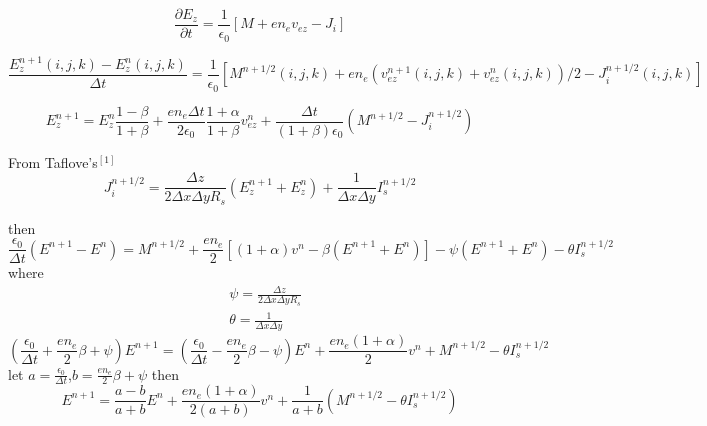 \documentclass[a4paper,10pt]{article}
\begin{document}
\begin{equation}\label{eqEz}
\frac{\partial E_{z}}{\partial t}=\frac{1}{\epsilon_{0}}\left[M+e n_{e}v_{ez}-J_i\right]
\end{equation}

\begin{equation}
\frac{E_{z}^{n+1}(i,j,k)-E_{z}^{n}(i,j,k)}{\Delta t}=\frac{1}{\epsilon_{0}}\left[M^{n+1/2}(i,j,k)+e n_{e}(v^{n+1}_{ez}(i,j,k)+v^{n}_{ez}(i,j,k))/2-J_{i}^{n+1/2}(i,j,k)\right]
\end{equation}

\begin{equation}
E_{z}^{n+1}=E_{z}^{n}\frac{1-\beta}{1+\beta}+\frac{e n_{e}\Delta t}{2\epsilon_{0}}\frac{1+\alpha}{1+\beta}v_{ez}^{n}+\frac{\Delta t}{(1+\beta)\epsilon_{0}}(M^{n+1/2}-J_{i}^{n+1/2})
\end{equation}

From Taflove's$^{[1]}$
\begin{equation}
J_{i}^{n+1/2}=\frac{\Delta z}{2\Delta x \Delta y R_{s}}(E_{z}^{n+1}+E_{z}^{n})+\frac{1}{\Delta x \Delta y}I_{s}^{n+1/2}
\end{equation}

then
\begin{equation}
\frac{\epsilon_{0}}{\Delta t}(E^{n+1}-E^n)=M^{n+1/2}+\frac{e n_e}{2}\left[(1+\alpha)v^{n}-\beta\left(E^{n+1}+E^n\right)\right]-\psi\left(E^{n+1}+E^n\right)-\theta I_{s}^{n+1/2}
\end{equation}
where
\begin{eqnarray}
&\psi=\frac{\Delta z}{2\Delta x \Delta y R_{s}} \\ 
&\theta=\frac{1}{\Delta x \Delta y}
\end{eqnarray}
\begin{equation}
(\frac{\epsilon_0}{\Delta t}+\frac{e n_e}{2}\beta+\psi)E^{n+1}=
(\frac{\epsilon_0}{\Delta t}-\frac{e n_e}{2}\beta-\psi)E^{n}
+\frac{e n_e (1+\alpha)}{2}v^n+M^{n+1/2}-\theta I_{s}^{n+1/2}
\end{equation}
let $a=\frac{\epsilon_0}{\Delta t}$,$b=\frac{e n_e}{2}\beta+\psi$ then
\begin{equation}
E^{n+1}=\frac{a-b}{a+b}E^n+\frac{e n_e (1+\alpha)}{2(a+b)}v^n+\frac{1}{a+b}(M^{n+1/2}-\theta I_{s}^{n+1/2})
\end{equation}
\end{document}
